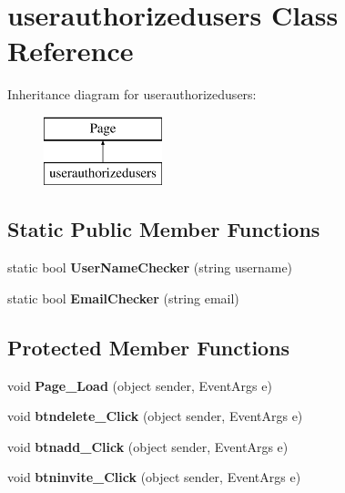 \hypertarget{classuserauthorizedusers}{\section{userauthorizedusers Class Reference}
\label{classuserauthorizedusers}
}
Inheritance diagram for userauthorizedusers\-:\begin{figure}[H]
\begin{center}
\leavevmode
\includegraphics[height=2.000000cm]{classuserauthorizedusers}
\end{center}
\end{figure}
\subsection*{Static Public Member Functions}
\begin{DoxyCompactItemize}
\item 
\hypertarget{classuserauthorizedusers_ae78ced84d8ddee83a25a6fb12f67961a}{static bool {\bfseries User\-Name\-Checker} (string username)}\label{classuserauthorizedusers_ae78ced84d8ddee83a25a6fb12f67961a}

\item 
\hypertarget{classuserauthorizedusers_ae560999e231106ac25eb3741b5ec7220}{static bool {\bfseries Email\-Checker} (string email)}\label{classuserauthorizedusers_ae560999e231106ac25eb3741b5ec7220}

\end{DoxyCompactItemize}
\subsection*{Protected Member Functions}
\begin{DoxyCompactItemize}
\item 
\hypertarget{classuserauthorizedusers_a18be3c06e0da73889a018a2700f31486}{void {\bfseries Page\-\_\-\-Load} (object sender, Event\-Args e)}\label{classuserauthorizedusers_a18be3c06e0da73889a018a2700f31486}

\item 
\hypertarget{classuserauthorizedusers_afa879b631de00b17a7302cb05c27be3e}{void {\bfseries btndelete\-\_\-\-Click} (object sender, Event\-Args e)}\label{classuserauthorizedusers_afa879b631de00b17a7302cb05c27be3e}

\item 
\hypertarget{classuserauthorizedusers_aa9d33cb9d8c5b6e0fe1a518b670bcab5}{void {\bfseries btnadd\-\_\-\-Click} (object sender, Event\-Args e)}\label{classuserauthorizedusers_aa9d33cb9d8c5b6e0fe1a518b670bcab5}

\item 
\hypertarget{classuserauthorizedusers_a0ff994f3a30f20212e2ee83de21e9c4a}{void {\bfseries btninvite\-\_\-\-Click} (object sender, Event\-Args e)}\label{classuserauthorizedusers_a0ff994f3a30f20212e2ee83de21e9c4a}

\end{DoxyCompactItemize}


